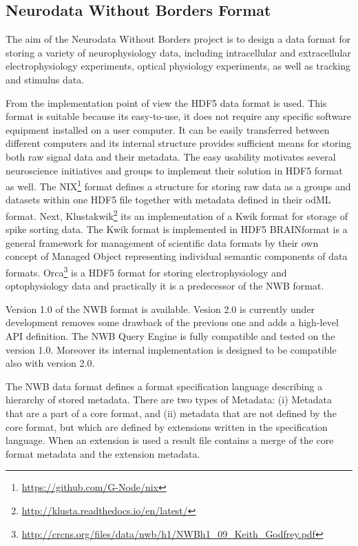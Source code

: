 \documentclass[utf8]{frontiersSCNS} %
\begin{document}
\subsection{Neurodata Without Borders Format}
\label{nwb}

The aim of the Neurodata Without Borders project is to design a data format for storing a variety of neurophysiology data, including intracellular and extracellular electrophysiology experiments, optical physiology experiments, as well as tracking and stimulus data.

From the implementation point of view the HDF5 data format is used. This format is suitable because its easy-to-use, it does not require any specific software equipment installed on a user computer. It can be easily transferred between different computers and its internal structure provides sufficient means for storing both raw signal data and their metadata. The easy usability motivates several neuroscience initiatives and groups to implement their solution in HDF5 format as well. The NIX\footnote{\url{https://github.com/G-Node/nix}} format defines a structure for storing raw data as a groups and datasets within one HDF5 file together with metadata defined in their odML \citep{10.3389/fninf.2011.00016} format. Next,  Klustakwik\footnote{\url{http://klusta.readthedocs.io/en/latest/}} its an implementation of a Kwik format for storage of spike sorting data. The Kwik format is implemented in HDF5 BRAINformat \citep{10.3389/fninf.2016.00048} is a general framework for management of scientific data formats by their own concept of Managed Object representing individual semantic components of data formats.   Orca\footnote{\url{http://crcns.org/files/data/nwb/h1/NWBh1\_09\_Keith\_Godfrey.pdf}} is a HDF5 format for storing electrophysiology and optophysiology data and practically it is a predecessor of the NWB format.

Version 1.0 of the NWB format is available. Vesion 2.0 is currently under development removes some drawback of the previous one and adds a high-level API definition. The NWB Query Engine is fully compatible and tested on the version 1.0. Moreover its internal implementation is designed to be compatible also with version 2.0. 

The NWB data format defines a format specification language describing a hierarchy of stored metadata. There are two types of Metadata: (i) Metadata that are a part of a core format, and (ii) metadata that are not defined by the core format, but which are defined by extensions written in the specification language. When an extension is used a result file contains a merge of the core format metadata and the extension metadata.
\end{document}
